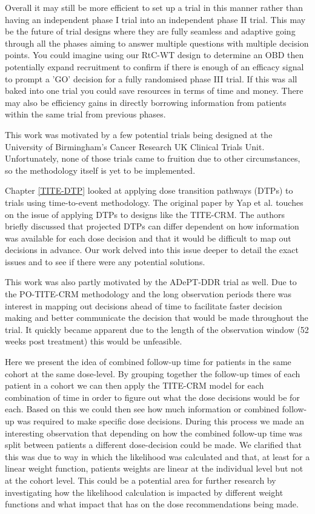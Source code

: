 Overall it may still be more efficient to set up a trial in this manner rather than having an independent phase \RN{1} trial into an independent phase \RN{2} trial. This may be the future of trial designs where they are fully seamless and adaptive going through all the phases aiming to answer multiple questions with multiple decision points. You could imagine using our RtC-WT design to determine an OBD then potentially expand recruitment to confirm if there is enough of an efficacy signal to prompt a 'GO' decision for a fully randomised phase \RN{3} trial. If this was all baked into one trial you could save resources in terms of time and money. There may also be efficiency gains in directly borrowing information from patients within the same trial from previous phases. 

This work was motivated by a few potential trials being designed at the University of Birmingham's Cancer Research UK Clinical Trials Unit. Unfortunately, none of those trials came to fruition due to other circumstances, so the methodology itself is yet to be implemented.  

Chapter \ref{TITE-DTP} looked at applying dose transition pathways (DTPs) to trials using time-to-event methodology. The original paper by Yap et al. \cite{yapDoseTransitionPathways2017} touches on the issue of applying DTPs to designs like the TITE-CRM. The authors briefly discussed that projected DTPs can differ dependent on how information was available for each dose decision and that it would be difficult to map out decisions in advance. Our work delved into this issue deeper to detail the exact issues and to see if there were any potential solutions.

This work was also partly motivated by the ADePT-DDR trial as well. Due to the PO-TITE-CRM methodology and the long observation periods there was interest in mapping out decisions ahead of time to facilitate faster decision making and better communicate the decision that would be made throughout the trial. It quickly became apparent due to the length of the observation window (52 weeks post treatment) this would be unfeasible. 

Here we present the idea of combined follow-up time for patients in the same cohort at the same dose-level. By grouping together the follow-up times of each patient in a cohort we can then apply the TITE-CRM model for each combination of time in order to figure out what the dose decisions would be for each. Based on this we could then see how much information or combined follow-up was required to make specific dose decisions. During this process we made an interesting observation that depending on how the combined follow-up time was split between patients a different dose-decision could be made. We clarified that this was due to way in which the likelihood was calculated and that, at least for a linear weight function, patients weights are linear at the individual level but not at the cohort level. This could be a potential area for further research by investigating how the likelihood calculation is impacted by different weight functions and what impact that has on the dose recommendations being made. 

